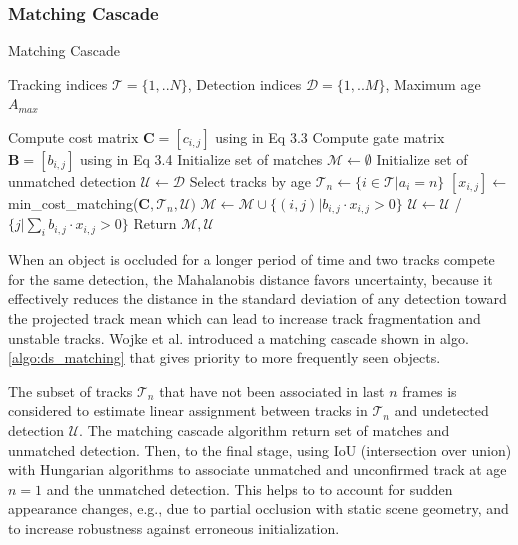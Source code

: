 \subsubsection{Matching Cascade}
\begin{algorithm}
\caption{Matching Cascade}\label{algo:ds_matching}
\begin{algorithmic}[1]
\INPUT Tracking indices $\mathcal{T} = \{1, .. N\}$, Detection indices $\mathcal{D} = \{1, .. M\}$, Maximum age $A_{max}$

\State Compute cost matrix $\mathbf{C} = [c_{i,j}]$ using in Eq 3.3
\State Compute gate matrix $\mathbf{B} = [b_{i,j}]$ using in Eq 3.4
\State Initialize set of matches $\mathcal{M} \leftarrow \emptyset$
\State Initialize set of unmatched detection $\mathcal{U}\leftarrow\mathcal{D}$
\State Select tracks by age $\mathcal{T}_n \leftarrow \{i \in \mathcal{T} | a_i = n\}$
\State $[x_{i,j}]\leftarrow$ min\_cost\_matching($\mathbf{C}, \mathcal{T}_n, \mathcal{U})$
\State $\mathcal{M} \leftarrow \mathcal{M} \cup \{(i,j) | b_{i,j}\cdot x_{i,j} > 0 \}$
\State $\mathcal{U} \leftarrow \mathcal{U}$ /\ $\{j |\underset{i}{\sum}b_{i,j}\cdot x_{i,j} > 0 \}$
\EndFor
\State Return $\mathcal{M}, \mathcal{U}$
\end{algorithmic}
\end{algorithm}
When an object is occluded for a longer period of time and two tracks compete for the same
detection, the Mahalanobis distance favors uncertainty, because it effectively reduces the
distance in the standard deviation of any detection toward the projected
track mean which can lead to increase track fragmentation and unstable tracks.\cite{Wojke2017simple}
Wojke et al.\cite{Wojke2017simple} introduced a matching cascade shown in algo.\ref{algo:ds_matching}
that gives priority to more frequently seen objects.\par
The subset of tracks $\mathcal{T}_n$ that have not been associated in last $n$
frames is considered to estimate linear assignment between tracks in $\mathcal{T}_n$ and undetected
detection $\mathcal{U}$. The matching cascade algorithm return set of matches and unmatched
detection. Then, to the final stage, using IoU (intersection over union) with Hungarian
algorithms to associate unmatched and unconfirmed track at age $n=1$ and the unmatched detection. This helps to to account for sudden appearance changes, e.g., due to partial occlusion with static scene geometry, and to
increase robustness against erroneous initialization\cite{Wojke2017simple}.\par




